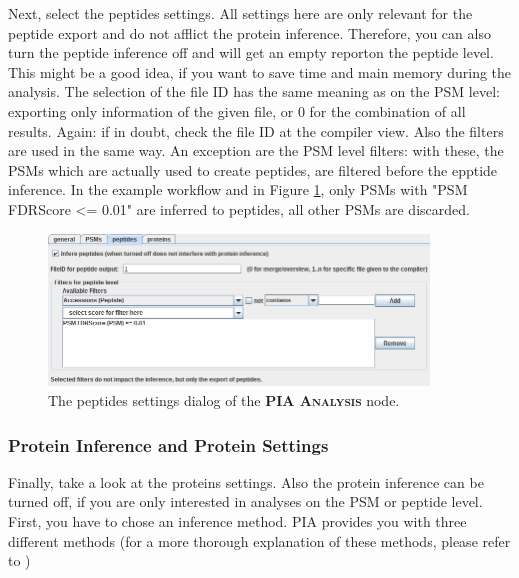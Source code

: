 \documentclass[a4paper,11pt,twoside]{article}
\newcommand{\knimenode}[1]{{\scshape\bfseries #1}}
\begin{document}
Next, select the peptides settings. All settings here are only relevant for the
peptide export and do not afflict the protein inference. Therefore, you can also
turn the peptide inference off and will get an empty reporton the peptide level.
This might be a good idea, if you want to save time and main memory during the
analysis. The selection of the file ID has the same meaning as on the PSM level:
exporting only information of the given file, or 0 for the combination of all
results. Again: if in doubt, check the file ID at the compiler view. Also the
filters are used in the same way. An exception are the PSM level filters: with
these, the PSMs which are actually used to create peptides, are filtered before
the epptide inference. In the example workflow and in Figure
\ref{pia_settings_peptides}, only PSMs with "PSM FDRScore <= 0.01" are inferred
to peptides, all other PSMs are discarded.

\begin{figure}[ht!]
	\centering
	\includegraphics[width=0.9\textwidth]{graphics/pia_settings_peptides}
	\caption{The peptides settings dialog of the \knimenode{PIA Analysis} node.}
	\label{pia_settings_peptides}
\end{figure}


\subsubsection{Protein Inference and Protein Settings}

Finally, take a look at the proteins settings. Also the protein inference can
be turned off, if you are only interested in analyses on the PSM or peptide
level. First, you have to chose an inference method. PIA provides you with
three different methods (for a more thorough explanation of these methods,
please refer to \cite{uszkoreit2015})
\end{document}
